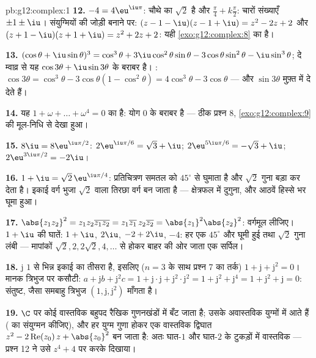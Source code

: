 \begin{solution}{pb:g12:complex:1}
\textbf{12.} $-4 = 4\eu^{\iu\pi}$: चौथे  का  $\sqrt2$ है और  $\frac{\pi}{4} + k\frac{\pi}{2}$: चारों
संख्याएँ $\pm 1 \pm \iu$। संयुग्मियों की जोड़ी बनाने पर: $(z - 1 - \iu)(z - 1 + \iu) = z^2 - 2z + 2$ और $(z + 1 - \iu)(z + 1 + \iu) = z^2 + 2z + 2$: यही \cref{exo:g12:complex:8} का
 है।

\textbf{13.} $(\cos\theta + \iu\sin\theta)^3 = \cos^3\theta +
3\iu\cos^2\theta\sin\theta - 3\cos\theta\sin^2\theta -
\iu\sin^3\theta$; दे म्वाव्र से यह $\cos 3\theta + \iu \sin 3\theta$ के बराबर है। : $\cos 3\theta = \cos^3\theta - 3\cos\theta(1 - \cos^2\theta)
= 4\cos^3\theta - 3\cos\theta$
--- और  $\sin 3\theta$ मुफ़्त में दे देते हैं।

\textbf{14.} यह $1 + \omega + \dots + \omega^4 = 0$ का  है: योग $0$ के बराबर है --- ठीक
प्रश्न 8, \cref{exo:g12:complex:9} की मूल-निधि से देखा हुआ।

\textbf{15.} $8\iu = 8\eu^{\iu\pi/2}$:  $2\eu^{\iu\pi/6} = \sqrt3 + \iu$; $2\eu^{5\iu\pi/6} = -\sqrt3 + \iu$; $2\eu^{3\iu\pi/2} = -2\iu$।

\textbf{16.} $1 + \iu = \sqrt2\,\eu^{\iu\pi/4}$: प्रतिचित्रण समतल को $45^\circ$ से घुमाता है और $\sqrt2$ गुना बड़ा
कर देता है। इकाई वर्ग भुजा $\sqrt2$ वाला तिरछा वर्ग बन जाता है --- क्षेत्रफल में
दुगुना, और आठवें हिस्से भर घूमा हुआ।

\textbf{17.} $\abs{z_1 z_2}^2 = z_1 z_2 \overline{z_1 z_2} =
z_1\overline{z_1}\, z_2\overline{z_2} =
\abs{z_1}^2\abs{z_2}^2$: वर्गमूल लीजिए। $1 + \iu$ की घातें: $1 + \iu$, $2\iu$, $-2 + 2\iu$, $-4$:
हर एक $45^\circ$ और घूमी हुई तथा $\sqrt2$ गुना लंबी --- मापांकों $\sqrt2, 2, 2\sqrt2, 4, \dots$ से होकर बाहर
की ओर जाता एक सर्पिल।

\textbf{18.} $\mathrm{j}$ $1$ से भिन्न इकाई का तीसरा  है, इसलिए ($n = 3$ के साथ
प्रश्न 7 का तर्क) $1 + \mathrm{j} + \mathrm{j}^2 = 0$। मानक त्रिभुज पर कसौटी: $a + \mathrm{j}b + \mathrm{j}^2 c = 1 +
\mathrm{j}\cdot\mathrm{j} + \mathrm{j}^2 \cdot \mathrm{j}^2 =
1 + \mathrm{j}^2 + \mathrm{j}^4 = 1 + \mathrm{j}^2 +
\mathrm{j} = 0$: संतुष्ट, जैसा समबाहु
त्रिभुज $\left(1, \mathrm{j}, \mathrm{j}^2\right)$ माँगता है।

\textbf{19.} $\C$ पर कोई वास्तविक बहुपद रैखिक गुणनखंडों में बँट जाता है;
उसके अवास्तविक   युग्मों में आते हैं ( का संयुग्मन कीजिए),
और हर युग्म गुणा होकर एक वास्तविक द्विघात $z^2 - 2\operatorname{Re}(z_0)\,z + \abs{z_0}^2$ बन जाता है: अतः घात-$1$ और
घात-$2$ के टुकड़ों में वास्तविक  --- प्रश्न 12 ने उसे $z^4 + 4$ पर करके
दिखाया।


\end{solution}
